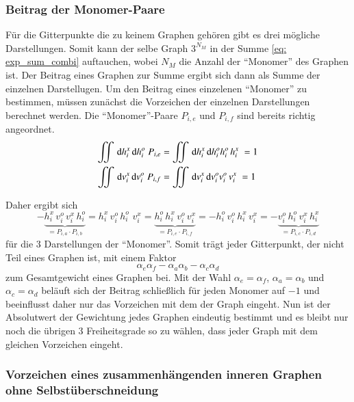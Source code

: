 \subsubsection{Beitrag der Monomer-Paare} \label{sec: vorzeicehnMonomer}

Für die Gitterpunkte die zu keinem Graphen gehören gibt es drei mögliche Darstellungen. Somit kann der selbe Graph $3^{N_M}$ in der Summe \eqref{eq: exp_sum_combi} auftauchen, wobei ${N_M}$ die Anzahl der ``Monomer'' des Graphen ist. Der Beitrag eines Graphen zur Summe ergibt sich dann als Summe der einzelnen Darstellugen. Um den Beitrag eines einzelenen ``Monomer'' zu bestimmen, müssen zunächst die Vorzeichen der einzelnen Darstellungen berechnet werden. Die ``Monomer''-Paare $P_{i,e}$ und $P_{i,f}$ sind bereits richtig angeordnet. 
\begin{align}
\iint \,\mathrm{d} h_{i}^x\,\mathrm{d} h_{i}^o \; P_{i,e} &= \iint \,\mathrm{d} h_{i}^x\,\mathrm{d} h_{i}^o h_{i}^o\,h_{i}^x\;  = 1\\
\iint \,\mathrm{d} v_{i}^x\,\mathrm{d} v_{i}^o \; P_{i,f} &= \iint \,\mathrm{d} v_{i}^x\,\mathrm{d} v_{i}^o v_{i}^o\,v_{i}^x\;  = 1
\end{align} 

\noindent Daher ergibt sich 
\begin{equation} \label{eq: sign Monomer}
-\underbrace{h_{i}^x\, v_{i}^o \,v_{i}^x\,h_{i}^o}_{= P_{i,a}\cdot P_{i,b}} 
= h_{i}^x\, v_{i}^o\, h_{i}^o\,\,v_{i}^x 
= \underbrace{h_{i}^o\,h_{i}^x\, v_{i}^o\,v_{i}^x }_{= P_{i,e}\cdot P_{i,f}}= - h_{i}^o\,v_{i}^o\,h_{i}^x\,v_{i}^x 
= -\underbrace{v_{i}^o\,h_{i}^o\,v_{i}^x\,h_{i}^x}_{= P_{i,c}\cdot P_{i,d}}
\end{equation} für die 3 Darstellungen der ``Monomer''. Somit trägt jeder Gitterpunkt, der nicht Teil eines Graphen ist, mit einem Faktor 
$$\alpha_e \alpha_f - \alpha_a \alpha_b - \alpha_c \alpha_d$$
zum Gesamtgewicht eines Graphen bei. Mit der Wahl $\alpha_e = \alpha_f$, $\alpha_a = \alpha_b$ und $\alpha_c = \alpha_d$ beläuft sich der Beitrag schließlich für jeden Monomer auf $-1$ und beeinflusst daher nur das Vorzeichen mit dem der Graph eingeht. Nun ist der Absolutwert der Gewichtung jedes Graphen eindeutig bestimmt und es bleibt nur noch die übrigen 3 Freiheitsgrade so zu wählen, dass jeder Graph mit dem gleichen Vorzeichen eingeht. 

\subsubsection{Vorzeichen eines zusammenhängenden inneren Graphen ohne Selbstüberschneidung}

